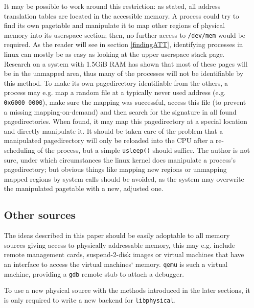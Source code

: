 It may be possible to work around this restriction: as stated, all address
translation tables are located in the accessible memory. A process could try to
find its own pagetable and manipulate it to map other regions of physical memory
into its userspace section; then, no further access to \texttt{/dev/mem} would
be required. As the reader will see in section \ref{findingATT}, identifying
processes in linux can mostly be as easy as looking at the upper userspace stack
page.  Research on a system with 1.5GiB RAM has shown that most of these pages
will be in the unmapped area, thus many of the processes will not be
identifiable by this method. To make its own pagedirectory identifiable from the
others, a process may e.g. map a random file at a typically never used address
(e.g.  \texttt{0x6000~0000}), make sure the mapping was successful, access this
file (to prevent a missing mapping-on-demand) and then search for the signature
in all found pagedirectories. When found, it may map this pagedirectory at a
special location and directly manipulate it. It should be taken care of the
problem that a manipulated pagedirectory will only be reloaded into the CPU
after a re-scheduling of the process, but a simple \texttt{usleep()} should
suffice. The author is not sure, under which circumstances the linux kernel does
manipulate a process's pagedirectory; but obvious things like mapping new
regions or unmapping mapped regions by system calls should be avoided, as the
system may overwrite the manipulated pagetable with a new, adjusted one.



\subsection{Other sources}

The ideas described in this paper should be easily adoptable to all memory
sources giving access to physically addressable memory, this may e.g. include
remote management cards, suspend-2-disk images or virtual machines that have an
interface to access the virtual machines` memory.  \texttt{qemu} is such a
virtual machine, providing a \texttt{gdb} remote stub to attach a debugger.

To use a new physical source with the methods introduced in the later sections,
it is only required to write a new backend for \texttt{libphysical}.

